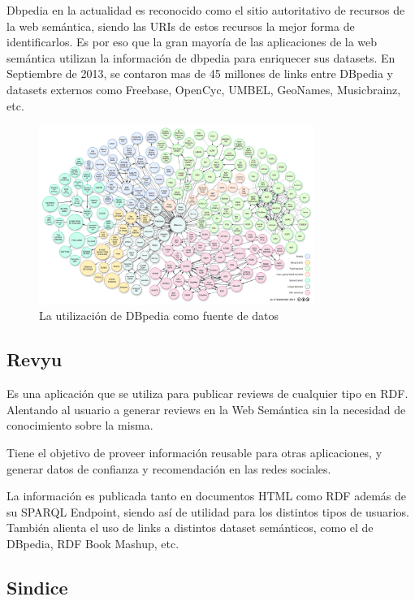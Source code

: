 Dbpedia \cite{dbpedia-swj} en la actualidad es reconocido como el sitio autoritativo de recursos de la web semántica, siendo las URIs de estos recursos 
la mejor forma de identificarlos.
Es por eso que la gran mayoría de las aplicaciones de la web semántica utilizan la información de dbpedia para enriquecer sus datasets.
En Septiembre de 2013, se contaron mas de 45 millones de links entre DBpedia y datasets externos como  Freebase, OpenCyc, UMBEL, GeoNames,
Musicbrainz, etc.

\begin{figure}
    \centering
    \includegraphics[width=0.8\textwidth,natwidth=610,natheight=642]{dbpedia}
    \caption{La utilización de DBpedia como fuente de datos}
\end{figure}

\subsection{Revyu}

\cite{Heath} Es una aplicación que se utiliza para publicar reviews de cualquier tipo en RDF. Alentando al usuario a generar reviews en la Web Semántica 
sin la necesidad de conocimiento sobre la misma.

Tiene el objetivo de proveer información reusable para otras aplicaciones, y generar datos de confianza y recomendación en las redes sociales.

La información es publicada tanto en documentos HTML como RDF además de su SPARQL Endpoint, siendo así de utilidad para los distintos tipos de usuarios.
También alienta el uso de links a distintos dataset semánticos, como el de DBpedia, RDF Book Mashup, etc.

\subsection{Sindice} 

